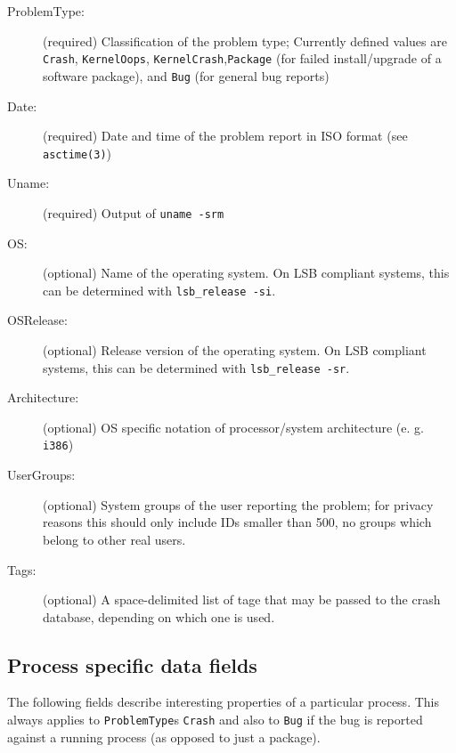 \documentclass[DIV12,halfparskip]{scrartcl}
\begin{document}
\begin{description}
    \item [ProblemType:] (required) Classification of the problem type;
    Currently defined values are \verb!Crash!, \verb!KernelOops!,
    \verb!KernelCrash!,\verb!Package! (for failed install/upgrade of a software
    package), and \verb!Bug! (for general bug reports)

    \item [Date:] (required) Date and time of the problem report in ISO format
    (see \verb!asctime(3)!)

    \item [Uname:] (required) Output of \verb!uname -srm!

    \item [OS:] (optional) Name of the operating system. On LSB compliant
    systems, this can be determined with \verb!lsb_release -si!.

    \item [OSRelease:] (optional) Release version of the operating system. On
    LSB compliant systems, this can be determined with \verb!lsb_release -sr!.

    \item [Architecture:] (optional) OS specific notation of
    processor/system architecture (e. g. \verb!i386!)

    \item [UserGroups:] (optional) System groups of the user reporting the
    problem; for privacy reasons this should only include IDs smaller than 500,
    no groups which belong to other real users.

    \item [Tags:] (optional) A space-delimited list of tage that may be passed
    to the crash database, depending on which one is used.
\end{description}

\subsection{Process specific data fields}

The following fields describe interesting properties of a particular process.
This always applies to \verb!ProblemType!s \verb!Crash! and also to \verb!Bug!
if the bug is reported against a running process (as opposed to just a
package).
\end{document}
